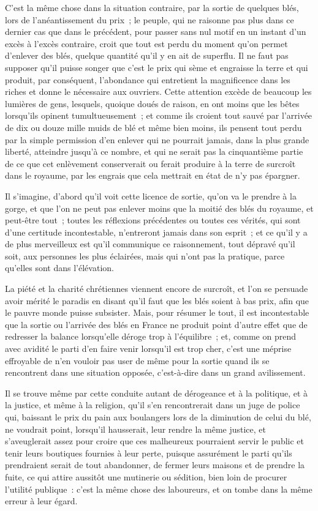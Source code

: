 \documentclass[french,twoside]{book} %
\begin{document}
C’est la même chose dans la situation contraire, par la sortie de quelques blés, lors de l’anéantissement du prix ; le peuple, qui ne raisonne pas plus dans ce dernier cas que dans le précédent, pour passer sans nul motif en un instant d’un excès à l’excès contraire, croit que tout est perdu du moment qu’on permet d’enlever des blés, quelque quantité qu’il y en ait de superflu. Il ne faut pas supposer qu’il puisse songer que c’est le prix qui sème et engraisse la terre et qui produit, par conséquent, l’abondance qui entretient la magnificence dans les riches et donne le nécessaire aux ouvriers. Cette attention excède de beaucoup les lumières de gens, lesquels, quoique doués de raison, en ont moins que les bêtes lorsqu’ils opinent tumultueusement ; et comme ils croient tout sauvé par l’arrivée de dix ou douze mille muids de blé et même bien moins, ils pensent tout perdu par la simple permission d’en enlever qui ne pourrait jamais, dans la plus grande liberté, atteindre jusqu’à ce nombre, et qui ne serait pas la cinquantième partie de ce que cet enlèvement conserverait ou ferait produire à la terre de surcroît dans le royaume, par les engrais que cela mettrait en état de n’y pas épargner.\par
Il s’imagine, d’abord qu’il voit cette licence de sortie, qu’on va le prendre à la gorge, et que l’on ne peut pas enlever moins que la moitié des blés du royaume, et peut-être tout ; toutes les réflexions précédentes ou toutes ces vérités, qui sont d’une certitude incontestable, n’entreront jamais dans son esprit ; et ce qu’il y a de plus merveilleux est qu’il communique ce raisonnement, tout dépravé qu’il soit, aux personnes les plus éclairées, mais qui n’ont pas la pratique, parce qu’elles sont dans l’élévation.\par
La piété et la charité chrétiennes viennent encore de surcroît, et l’on se persuade avoir mérité le paradis en disant qu’il faut que les blés soient à bas prix, afin que le pauvre monde puisse subsister. Mais, pour résumer le tout, il est incontestable que la sortie ou l’arrivée des blés en France ne produit point d’autre effet que de redresser la balance lorsqu’elle déroge trop à l’équilibre ; et, comme on prend avec avidité le parti d’en faire venir lorsqu’il est trop cher, c’est une méprise effroyable de n’en vouloir pas user de même pour la sortie quand ils se rencontrent dans une situation opposée, c’est-à-dire dans un grand avilissement.\par
Il se trouve même par cette conduite autant de dérogeance et à la politique, et à la justice, et même à la religion, qu’il s’en rencontrerait dans un juge de police qui, baissant le prix du pain aux boulangers lors de la diminution de celui du blé, ne voudrait point, lorsqu’il hausserait, leur rendre la même justice, et s’aveuglerait assez pour croire que ces malheureux pourraient servir le public et tenir leurs boutiques fournies à leur perte, puisque assurément le parti qu’ils prendraient serait de tout abandonner, de fermer leurs maisons et de prendre la fuite, ce qui attire aussitôt une mutinerie ou sédition, bien loin de procurer l’utilité publique : c’est la même chose des laboureurs, et on tombe dans la même erreur à leur égard.\par
\end{document}
